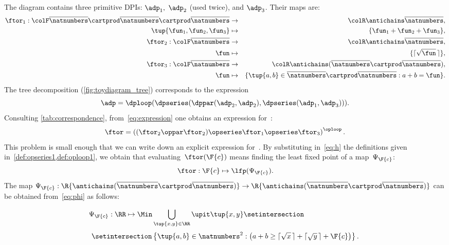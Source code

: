 The diagram contains three primitive DPIs: $\adp_{1},$ $\adp_{2}$ (used twice), and $\adp_{3}$.
Their \ftor maps are:
\begin{eqnarray*}
	\ftor_{1}:{\colF\overline{\natnumbers}\cartprod\overline{\natnumbers}\cartprod\overline{\natnumbers}} & \rightarrow & {\colR\antichains\overline{\natnumbers}},\\
	\tup{ \fun_{1},\fun_{2},\fun_{3}}  & \mapsto & \{\fun_{1}+\fun_{2}+\fun_{3}\},\\
	\ftor_{2}:{\colF\overline{\natnumbers}} & \rightarrow & {\colR\antichains\overline{\natnumbers}},\\
	\fun& \mapsto & \{\lceil\sqrt{\fun}\,\rceil\},\\
	\ftor_{3}:{\colF\overline{\natnumbers}} & \rightarrow & {\colR\antichains(\overline{\natnumbers}\cartprod\overline{\natnumbers})},\\
	\fun& \mapsto & \{\tup{ a,b} \in\overline{\natnumbers}\cartprod\overline{\natnumbers}:a+b=\fun\}.
\end{eqnarray*}
The tree decomposition (\cref{fig:toydiagram_tree}) corresponds to the expression
\begin{equation}
	\adp=\dploop(\dpseries(\dppar(\adp_{2},\adp_{2}),\dpseries(\adp_{1},\adp_{3}))).
	\label{eq:expression}
\end{equation}
Consulting \cref{tab:correspondence}, from~\cref{eq:expression} one obtains an expression for~\ftor:
\begin{equation}
	\ftor=\left((\ftor_{2}\oppar\ftor_{2})\opseries\ftor_{1}\opseries\ftor_{3}\right)^{\oploop}.
	\label{eq:h}
\end{equation}
This problem is small enough that we can write down an explicit expression for~\ftor.
By substituting in~\cref{eq:h} the definitions given in~\cref{def:opseries1,def:oploop1}, we obtain that evaluating~$\ftor(\F{c})$ means finding the least fixed point of a map~$\Psi_{\F{c}}$:
\begin{equation*}
	\ftor:\F{c}\mapsto\lfp(\Psi_{\F{c}}).
\end{equation*}
The map $\Psi_{\F{c}}:\R{\antichains(\overline{\natnumbers}\cartprod\overline{\natnumbers})}\rightarrow\R{\antichains(\overline{\natnumbers}\cartprod\overline{\natnumbers})}$ can be obtained from~\cref{eq:phi} as follows:

\begin{equation}
	\Psi_{\F{c}}:\RR\mapsto\Min\bigcup_{\tup{ x,y} \in\RR}\upit\tup{ x,y} \setintersection\qquad\qquad\qquad\qquad
\end{equation}
%
\begin{equation}
	\setintersection\left\{ \tup{ a,b} \in\natnumbers^{2}:\left(a+b\geq\lceil\sqrt{x}\,\rceil+\lceil\sqrt{y}\,\rceil+\F{c}\right)\right\}.
\end{equation}
%

